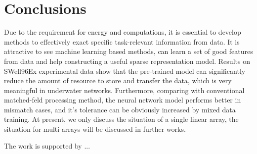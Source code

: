\section{Conclusions}
Due to the requirement for energy and computations, it is essential to develop methods to effectively exact specific task-relevant information from data.
It is attractive to see machine learning based methods, can learn a set of good features from data and help constructing a useful sparse representation model.
Results on SWell96Ex experimental data show that the pre-trained model can significantly reduce the amount of resource to store and transfer the data, which is very meaningful in underwater networks. Furthermore, comparing with conventional matched-feld processing method, the neural network model performs better in mismatch cases, and it's tolerance can be obviously increased by mixed data training.
At present, we only discuss the situation of a single linear array, the situation for multi-arrays will be discussed in further works. 

\begin{acks}
The work is supported by ...

\end{acks}
